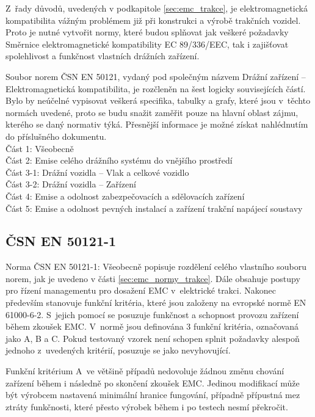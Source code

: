  Z~řady důvodů, uvedených v podkapitole \ref{sec:emc_trakce},  je elektromagnetická kompatibilita vážným problémem již při konstrukci a výrobě trakčních vozidel. Proto je nutné vytvořit normy, které budou splňovat jak veškeré požadavky Směrnice elektromagnetické kompatibility EC 89/336/EEC, tak i zajišťovat spolehlivost a funkčnost vlastních drážních zařízení.

Soubor norem ČSN EN 50121, vydaný pod společným názvem Drážní zařízení – Elektromagnetická kompatibilita, je rozčleněn na šest logicky souvisejících částí. Bylo by neúčelné vypisovat veškerá specifika, tabulky a grafy, které jsou v~těchto normách uvedené, proto se budu snažit zaměřit pouze na hlavní oblast zájmu, kterého se daný normativ týká. Přesnější informace je možné získat nahlédnutím do příslušného dokumentu. \bigskip \\
Část 1: Všeobecně\\
Část 2: Emise celého drážního  systému do vnějšího prostředí\\
Část 3-1: Drážní vozidla – Vlak a celkové vozidlo\\
Část 3-2: Drážní vozidla – Zařízení\\
Část 4: Emise a odolnost zabezpečovacích a sdělovacích zařízení\\
Část 5: Emise a odolnost pevných instalací a zařízení trakční napájecí soustavy\\

\subsection{ČSN EN 50121-1}
Norma ČSN EN 50121-1: Všeobecně popisuje rozdělení celého vlastního souboru norem, jak je uvedeno v části \ref{sec:emc_normy_trakce}. Dále obsahuje postupy pro řízení managementu pro dosažení EMC v~elektrické trakci. Nakonec především stanovuje funkční kritéria, které jsou založeny na evropské normě EN 61000-6-2. S~jejich pomocí se posuzuje funkčnost a schopnost provozu zařízení během zkoušek EMC. V~normě jsou definována 3 funkční kritéria, označovaná jako A, B a C. Pokud testovaný vzorek není schopen splnit požadavky alespoň jednoho z~uvedených kritérií, posuzuje se jako nevyhovující.

Funkční kritérium A~ve většině případů nedovoluje žádnou změnu chování zařízení během i následně po skončení zkoušek EMC. Jedinou modifikací může být výrobcem nastavená minimální hranice fungování, případně přípustná mez ztráty funkčnosti, které přesto výrobek během i po testech nesmí překročit.

